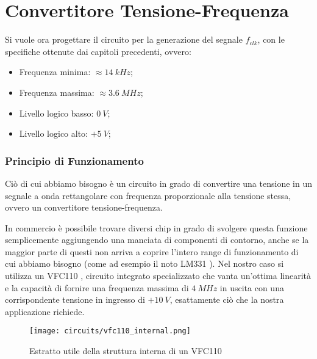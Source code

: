 \chapter{Convertitore Tensione-Frequenza}


Si vuole ora progettare il circuito per la generazione del segnale $f_{clk}$, con le
specifiche ottenute dai capitoli precedenti, ovvero:

\begin{itemize}
    \item Frequenza minima: $\approx 14\ kHz$;
    \item Frequenza massima: $\approx 3.6\ MHz$;
    \item Livello logico basso: $0\ V$;
    \item Livello logico alto: $+5\ V$;
\end{itemize}


\subsection*{Principio di Funzionamento}


Ciò di cui abbiamo bisogno è un circuito in grado di convertire una tensione in un segnale
a onda rettangolare con frequenza proporzionale alla tensione stessa, ovvero un convertitore
tensione-frequenza.

In commercio è possibile trovare diversi chip in grado di svolgere questa funzione
semplicemente aggiungendo una manciata di componenti di contorno, anche se la maggior
parte di questi non arriva a coprire l'intero range di funzionamento di cui abbiamo bisogno
(come ad esempio il noto LM331 \cite{lm331}). Nel nostro caso si utilizza un VFC110
\cite{vfc110}, circuito integrato specializzato che vanta un'ottima linearità e la capacità
di fornire una frequenza massima di $4\ MHz$ in uscita con una corrispondente tensione in
ingresso di $+10\ V$, esattamente ciò che la nostra applicazione richiede.

\begin{figure}[H]
    \centering
    \texttt{[image: circuits/vfc110\_internal.png]}
    \caption{Estratto utile della struttura interna di un VFC110}
    \label{vfc110_internal}
\end{figure}

